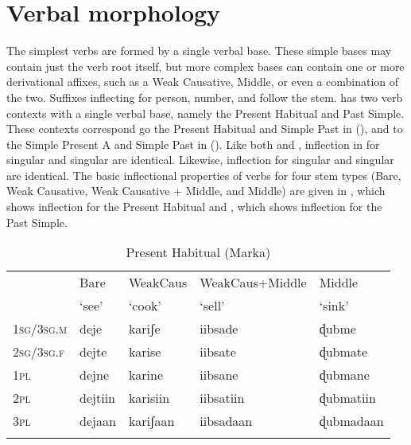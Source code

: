 \documentclass[output=paper,modfonts,nonflat,
colorlinks, citecolor=brown,
draftmode
]{langsci/langscibook}
\begin{document}
 \section{Verbal morphology}
 
The simplest  verbs are formed by a single verbal base. These simple bases may contain just the verb root itself, but more complex bases can contain one or more derivational affixes, such as a Weak Causative, Middle, or even a combination of the two. Suffixes inflecting for person, number, and  follow the stem.  has two verb contexts with a single verbal base, namely the Present Habitual and Past Simple. These contexts correspond go the Present Habitual and Simple Past in  (\citealt{Greenetal2015}), and to the Simple Present A and Simple Past in  (\citealt{PasterRanero2015}). Like both  and , inflection in  for  singular and   singular are identical. Likewise, inflection for  singular and   singular are identical. The basic inflectional properties of  verbs for four stem types (Bare, Weak Causative, Weak Causative + Middle, and Middle) are given in , which shows inflection for the Present Habitual and , which shows inflection for the Past Simple. 
 
 \begin{table}
 	\caption{{Present Habitual (Marka)}}
 	\label{tab:1:Present Habitual}
 	\begin{tabularx}{\textwidth}{Xllll} 
 		\lsptoprule
 		& Bare   & WeakCaus  & WeakCaus+Middle & Middle   \\
 		& `see' & `cook' & `sell' & `sink' \\ 
 		\midrule
 		1\textsc{sg}/3\textsc{sg.m} & deje & kariʃe & iibsade & ɖubme \\
 		2\textsc{sg}/3\textsc{sg.f} & dejte  & karise & iibsate  & ɖubmate  \\
 		1\textsc{pl} & dejne & karine & iibsane & ɖubmane \\
 		2\textsc{pl} & dejtiin & karisiin & iibsatiin & ɖubmatiin \\
 		3\textsc{pl} & dejaan & kariʃaan & iibsadaan & ɖubmadaan \\
 	
 		\lspbottomrule
 	\end{tabularx}
 \end{table}
 
\end{document}
